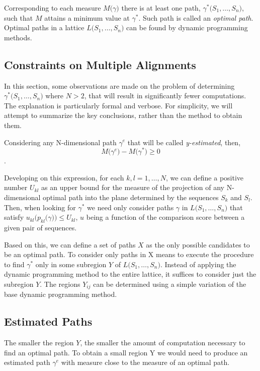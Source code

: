 \documentclass[11pt]{article}
\begin{document}
Corresponding to each measure $M\big(\gamma\big)$ there is at least one path, $\gamma^*\big(S_1, \dots, S_n\big)$, such that $M$ attains a minimum value at $\gamma^*$. Such path is called an \textit{optimal path}. Optimal paths in a lattice $L\big(S_1, \dots, S_n\big)$ can be found by dynamic programming methods.

\subsection{Constraints on Multiple Alignments}

In this section, some observations are made on the problem of determining $\gamma^*\big(S_1,\dots,S_n\big)$ where $N > 2$, that will result in significantly fewer computations. The explanation is particularly formal and verbose. For simplicity, we will attempt to summarize the key conclusions, rather than the method to obtain them.

Considering any N-dimensional path $\gamma^e$ that will be called \textit{y-estimated}, then, $$M\big(\gamma^e\big) - M\big(\gamma^*\big) \geq 0$$.

Developing on this expression, for each $k,l = 1,\dots, N$, we can define a positive number $U_{kl}$ as an upper bound for the measure of the projection of any N-dimensional optimal path into the plane determined by the sequences $S_k$ and $S_l$. Then, when looking for $\gamma^*$ we need only consider paths $\gamma$ in $L\big(S_1, \dots, S_n\big)$ that satisfy $u_{kl}\big(p_{kl}\big(\gamma\big)\big) \leq U_{kl}$, $u$ being a function of the comparison score between a given pair of sequences. 

Based on this, we can define a set of paths $X$ as the only possible candidates to be an optimal path. To consider only paths in X means to execute the procedure to find $\gamma^*$ only in some subregion $Y$ of $L(S_1,\dots,S_n\big)$. Instead of applying the dynamic programming method to the entire lattice, it suffices to consider just the subregion $Y$. The regions $Y_{ij}$ can be determined using a simple variation of the base dynamic programming method. 

\subsection{Estimated Paths}

The smaller the region $Y$, the smaller the amount of computation necessary to find an optimal path. To obtain a small region Y we would need to produce an estimated path $\gamma^e$ with measure close to the measure of an optimal path. 
\end{document}
